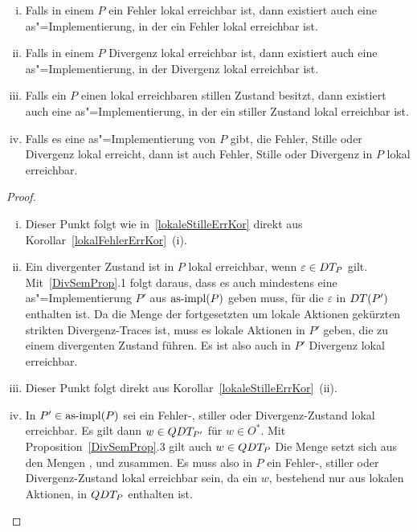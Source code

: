 \begin{Kor}\mbox{}
  \label{lokalDivErrKor}
  \begin{enumerate}[(i)]
    \item Falls in einem \MEIO{} $P$ ein Fehler lokal erreichbar ist, dann
      existiert auch eine as"=Implementierung, in der ein Fehler lokal
      erreichbar ist.
    \item Falls in einem \MEIO{} $P$ Divergenz lokal erreichbar ist, dann
      existiert auch eine as"=Implementierung, in der Divergenz lokal
      erreichbar ist.
    \item Falls ein \MEIO{} $P$ einen lokal erreichbaren stillen Zustand
      besitzt, dann existiert auch eine as"=Implementierung, in der ein stiller
      Zustand lokal erreichbar ist.
    \item Falls es eine as"=Implementierung von $P$ gibt, die Fehler, Stille
      oder Divergenz lokal erreicht, dann ist auch Fehler, Stille oder
      Divergenz in $P$ lokal erreichbar.
  \end{enumerate}
\end{Kor}
\begin{proof}\mbox{}
  \begin{enumerate}[(i)]
    \item Dieser Punkt folgt wie in~\ref{lokaleStilleErrKor} direkt aus
      Korollar~\ref{lokalFehlerErrKor}~(i).
    \item Ein divergenter Zustand ist in $P$ lokal erreichbar, wenn
      $\varepsilon \in DT _P$ gilt. Mit~\ref{DivSemProp}.1 folgt daraus, dass
      es auch mindestens eine as"=Implementierung $P'$ aus $\mathrm{as}\text{-}\mathrm{impl} (P)$ geben
      muss, für die $\varepsilon$ in $DT (P')$ enthalten ist. Da \DT{} die
      Menge der fortgesetzten um lokale Aktionen gekürzten strikten
      Divergenz-Traces ist, muss es lokale Aktionen in $P'$ geben, die zu einem
      divergenten Zustand führen. Es ist also auch in $P'$ Divergenz lokal
      erreichbar.
    \item Dieser Punkt folgt direkt aus Korollar~\ref{lokaleStilleErrKor}~(ii).
    \item In $P'\in\mathrm{as}\text{-}\mathrm{impl} (P)$ sei ein Fehler-, stiller oder Divergenz-Zustand
      lokal erreichbar. Es gilt dann $w\in QDT _{P'}$ für $w\in O^*$. Mit
      Proposition~\ref{DivSemProp}.3 gilt auch $w\in QDT _P$ Die Menge \QDT{}
      setzt sich aus den Mengen \ET{}, \StQT{} und \DT{} zusammen. Es muss also
      in $P$ ein Fehler-, stiller oder Divergenz-Zustand lokal erreichbar sein,
      da ein $w$, bestehend nur aus lokalen Aktionen, in $QDT _P$ enthalten
      ist.
  \end{enumerate}
\end{proof}

